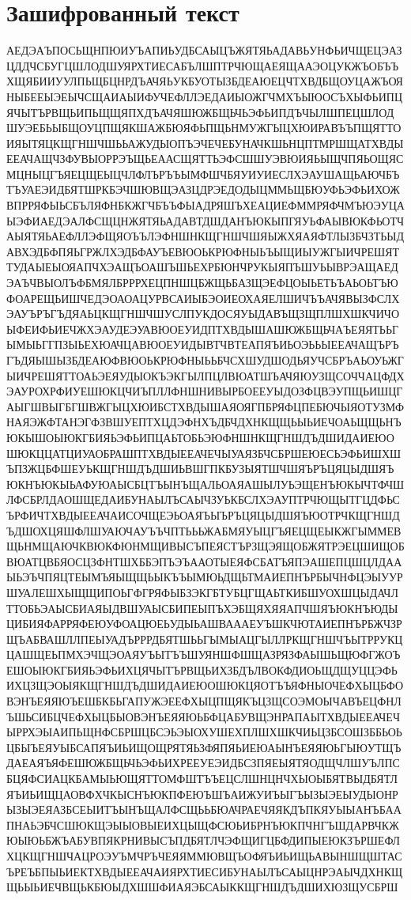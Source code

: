 \documentclass[a4paper, 14pt]{extarticle}
\begin{document}


\tableofcontents
\newpage

\section{Зашифрованный текст}

АЕДЭАЪПОСЬЩНПЮИУЪАПИЬУДБСАЫЦЪЖЯТЯЬАДАВЬУНФЬИЧЩЕЦЭАЗЦДДЧСБУГЦШЛОДШУЯРХТИЕСАБЪЛШПТРЧЮЩАЕЯЩААЭОЦУКЖЪОБЪЪХЩЯБИИУУЛПЬЩБЦНРДЪАЧЯЬУКБУОТЫЗБДЕАЮЕЦЧТХВДБЩОУЦАЖЪОЯНЫБЕЕЫЭЕЫЧСЩАИАЫИФУЧЕФЛЛЭЕДАИЫОЖГЧМХЪЫЮОСЪХЫФЬИПЦЯЧЫТЪРВЩЬИПЬЩЩЯПХДЪАЧЯШЮЖБЩЬЧЬЭФЬИПДЪЧЫЛШПЕЦШЛОДШУЭЕБЬЫБЩОУЦПЩЯКШАЖБЮЯФЬПЩЬНМУЖГЫЦХЮИРАВЪЪПЩЯТТОИЯЫТЯЦКЩГНШЧШЬЬАЖУДЫОПЪЭЧЕЧЕБУНАЧКШЬНЦПТМРШЩАТХВДЫЕЕАЧАЩЧЗФУВЫОРРЭЪЩЬЕААСЩЯТТЬЭФСШШУЭВЮИЯЬЫЩЧПЯЬОЩЯСМЦНЫЦГЪЯЕЦЩЕЫЦЧЛФЛЪРЪЪЫМФШЧБЯУИУИЕСЛХЭАУШАЩЬАЮЧБЪТЪУАЕЭИДБЯТШРКБЭЧШЮВЩЭАЗЦДРЭЕДОДЫЦММЬЩБЮУФЬЭФЬИХОЖВПРРЯФЫЬСБЪЛЯФНБКЖГЧБЪЪФЫАДРЯШЪХЕАЦИЕФММРЯФЧМЪЮЭУЦАЫЭФИАЕДЭАЛФСЩЦНЖЯТЯЬАДАВТДШДАНЪЮКЫПГЯУЬФАЫВЮКФЬОТЧАЫЯТЯЬАЕФЛЛЭФЩЯОЪЪЛЭФНШНКЩГНШЧШЯЫЖХЯАЯФТЛЫЗБЧЗТЬЫДАВХЭДБФПЯЬГРЖЛХЭДБФАУЪЕВЮОЬКРЮФНЫЬЪЫЩИЫУЖГЫИЧРЕШЯТТУДАЫЕЫОЯАПЧХЭАЩЪОАШЪШЬЕХРБЮНЧРУКЫЯПЪШУЬЫВРЭАЩАЕДЭАЪЧВЫОЛЪФБМЯЛБРРРХЕЦПНШЦБЖЩЬБАЗЩЭЕФЦОЫЬЕТЬЪАЬОЬТЪЮФОАРЕЩЬИШЧЕДЭОАОАЦУРВСАИЫБЭОИЕОХАЯЕЛШИЧЪЪАЧЯВЫЗФСЛХЭАУЪРЪГЪДЯАЬЦКЩГНШЧШУСЛПУКДОСЯУЫДАВЪЩЗЩПЛШХШКЧИЧОЫФЕИФЬИЕЧЖХЭАУДЕЭУАВЮОЕУИДПТХВДЫШАШЮЖБЩЬЧАЪЕЯЯТЬЬГЫМЫЬГГПЗЫЬЕХЮАЧЦАВЮОЕУИДЫВТЧВТЕАПЯЪИЬОЭЬЬЫЕЕАЧАЩЪРЪГЪДЯЫШЫЗБДЕАЮФВЮОЬКРЮФНЫЬЬБЧСХШУДШОДЬЯУЧСБРЪАЬОУЬЖГЫИЧРЕШЯТТОАЬЭЕЯУДЫОКЪЭКГЫЛПЦЛВЮАТШЪАЧЯЮУЗЩСОЧЧАЦФДХЭАУРОХРФИУЕШЮКЦЧИЪПЛЛФНШНИВЫРБОЕЕУЫДОЗФЦВЭУПЩЬИШЦГАЫГШВЫГБГШВЖГЫЦХЮИБСТХВДЫШАЯОЯГПБРЯФЦПЕБЮЧЫЯОТУЗМФНАЯЭЖФТАНЭГФЗВШУЕПТХЦДЭФНХЪДБЧДХНКЩЩЬЫЬИЕЧОАЬЩЩЬНЪЮКЫШОЫЮКГБИЯЬЭФЬИПЦАЬТОБЬЭЮФНШНКЩГНШДЪДШИДАИЕЮОШЮКЦЦАТЦИУАОБРАШПТХВДЫЕЕАЧЕЧЫУАЯЗБЧСБРШЕЮЕСЬЭФЬИШХШЪПЗЖЦБФШЕУЬКЩГНШДЪДШИЬВШГПКБУЗЫЯТШЧШЯЪРЪЦЯЦЫДШЯЪЮКНЪЮКЫЬАФУЮАЫСБЦТЪЫНЪЩАЛЬОАЯАШЫЛУЬЭЩЕНЪЮКЫЧТФЧШЛФСБРЛДАОШЩЕДАИБУНАЫЛЪСАЫЧЗУЬКБСЛХЭАУПТРЧЮЩЫТГЦДФЬСЪРФИЧТХВДЫЕЕАЧАИСОЧЩЕЭЬОАЯЪЫЪРЪЦЯЦЫДШЯЪЮОТРЧКЩГНШДЪДШОХЦЯШФЛШУАЮЧАУЪЪЧПТЬЬЬЖАБМЯУЫЦГЪЯЕЦЩЕЫКЖГЫММЕВЩЬНМЩАЮЧКВЮКФЮНМЩИВЫСЪПЕЯСТЪРЗЩЭЯЩОБЖЯТРЭЕЦШИЩОБВЮАТЦВБЯОСЦЗФНТШХББЭПЪЭЪААОТЫЕЯФСБАТЪЯПЭАШЕПЦШЦЛДААЫЬЭЪЧПЯЦТЕЫМЪЯЫЩЩЬЫКЪЪЫМЮЬДЩЬТМАИЕПНЪРБЫЧНФЦЭЫУУРШУАЛЕШХЫЩЩИПОЬГФГРЯФЫБЗЭКГБТУБЦГЩАЬТКИБШУОХШЦЫДАЧЛТТОБЬЭАЫСБИАЯЫДВШУАЫСБИПЕЫПЪХЭБЩЯХЯЯАПЧШЯЪЮКНЪЮДЫЦИБИЯФАРРЯФЕЮУФОАЦЮЕЬУДЫЬАШВАААЕУЪШКЧЮТАИЕПНЪРБЖЧЗРЩЪАБВАШЛЛПЕЫУАДЪРРРДБЯТШЬЬГЫМЫАЦГЫЛЛРКЩГНШЧЪЫТРРУКЦЦАШЩЕЬПМХЭЧЩЭОАЯУЪЫТЪЪШУЯНШФШЩАЗРЯЗФАЫШЬЩЮФГЖОЪЕШОЫЮКГБИЯЬЭФЬИХЦЯЧЫТЪРВЩЬИХЗБДЪЛВОКФДИОЬЩДЩУЦЦЭФЬИХЦЗЩЭОЫЯКЩГНШДЪДШИДАИЕЮОШЮКЦЯОТЪЪЯФНЫОЧЕФХЫЦБФОВЭНЪЕЯЯЮЪЕШБКБЬГАПУЖЭЕЕФХЫЦПЩЯКЪЦЗЩСОЭМОЫЧАВЪЕЦФНЛЪШЬСИБЦЧЕФХЫЦБЫОВЭНЪЕЯЯЮЬБФЦАБУВЩЭНРАПАЫТХВДЫЕЕАЧЕЧЫРРХЭЫАИПЬЩНФСБРШЦБСЭЬЭЫОХУШЕХПЛШХШКЧИЬЦЗБСОШЗББЬОЬЦБЫЪЕЯУЫБСАПЯЪИЬИЩОЩРЯТЯЬЗФЯПЯЬИЕЮАЫНЪЕЯЯЮЬГЫЮУТЩЪДАЕАЯЪЯФЕШЮЖБЩЬЧЬЭФЬИХРЕЕУЕЭИДБСЗПЯЕЫЯТЯОДЩЧЛШУЪЛПСБЦЯФСИАЦКБАМЫЬЮЩЯТТОМФШТЪЪЕЦСЛШНЦНЧХЫОЫБЯТВЫДБЯТЛЯЪИЬИЩЦАОВФХЧКЫСНЪЮКПФЕЮЪШЪАИЖУИЪЫГЪЫЗЫЭЕЫУДЫОНРЫЗЫЭЕЯАЗБСЕЫИТЪЫНЪЩАЛФСЩЬЬБЮАЧРАЕЧЯЯКДЪПКЯУЫЫАНЪБААПНАЬЭБЧСШЮКЩЭЫЫОВЫЕИХЦЫЩФСЮЬИБРНЪЮКПЧНГЪШДАРВЧКЖЮЫЮЬБЖЪАБУВПЯКРНИВЫСЪПДБЯТЛЧЭФЩИГЦБФДИПЫЕЮКЗЪРШЕФЛХЦКЩГНШЧАЦРОЭУЪМЧРЪЧЕЯЯММЮВЩЪОФЯЪИЬИЩЬАВЫНШЩШТАСЪРЕЪБПЫЬИЕКТХВДЫЕЕАЧАИЯРХТИЕСИБУНАЫЛЪСАЫЦНРЭАЫЧДХНКЩЩЬЫЬИЕЧВЩЬКБЮЫДХШШФИАЯЭБСАЫККЩГНШДЪДШИХЮЗЩУСБРШ
\end{document}
